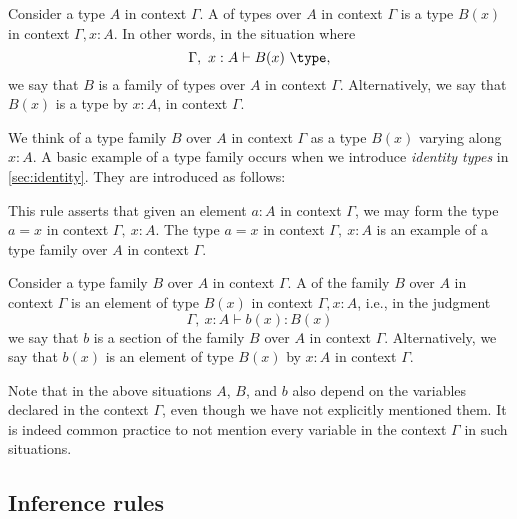 \begin{defn}
  Consider a type $A$ in context $\Gamma$. A  of types over $A$ in context $\Gamma$ is a type $B(x)$ in context $\Gamma,x:A$. In other words, in the situation where
\begin{equation*}
  \Gamma,~x:A\vdash B(x)~\type,
\end{equation*}
we say that $B$ is a family of types over $A$ in context $\Gamma$. Alternatively, we say that $B(x)$ is a type  by $x:A$, in context $\Gamma$.
\end{defn}

We think of a type family $B$ over $A$ in context $\Gamma$ as a type $B(x)$ varying along $x:A$. A basic example of a type family occurs when we introduce \emph{identity types} in \cref{sec:identity}. They are introduced as follows:
\begin{prooftree}
\end{prooftree}
This rule asserts that given an element $a:A$ in context $\Gamma$, we may form the type $a=x$ in context $\Gamma,~x:A$. The type $a=x$ in context $\Gamma,~x:A$ is an example of a type family over $A$ in context $\Gamma$.

\begin{defn}
Consider a type family $B$ over $A$ in context $\Gamma$. A  of the family $B$ over $A$ in context $\Gamma$ is an element of type $B(x)$ in context $\Gamma,x:A$, i.e., in the judgment
\begin{equation*}
  \Gamma,~x:A\vdash b(x):B(x)
\end{equation*}
we say that $b$ is a section of the family $B$ over $A$ in context $\Gamma$. Alternatively, we say that $b(x)$ is an element of type $B(x)$  by $x:A$ in context $\Gamma$.
\end{defn}

Note that in the above situations $A$, $B$, and $b$ also depend on the variables declared in the context $\Gamma$, even though we have not explicitly mentioned them. It is indeed common practice to not mention every variable in the context $\Gamma$ in such situations.

\subsection{Inference rules}\label{sec:rules}

